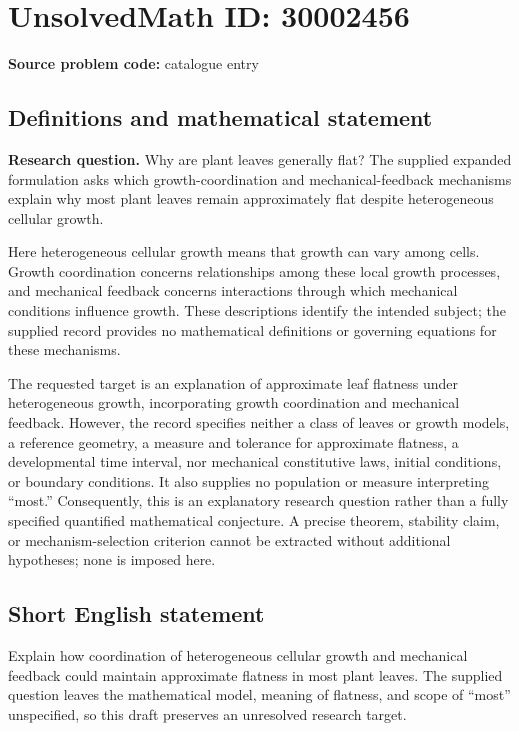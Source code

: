 \documentclass[11pt]{article}
\begin{document}
\section*{UnsolvedMath ID: 30002456}
\textbf{Source problem code:} catalogue entry
\subsection{Definitions and mathematical statement}
\textbf{Research question.} Why are plant leaves generally flat? The supplied expanded formulation asks which growth-coordination and mechanical-feedback mechanisms explain why most plant leaves remain approximately flat despite heterogeneous cellular growth.

Here heterogeneous cellular growth means that growth can vary among cells. Growth coordination concerns relationships among these local growth processes, and mechanical feedback concerns interactions through which mechanical conditions influence growth. These descriptions identify the intended subject; the supplied record provides no mathematical definitions or governing equations for these mechanisms.

The requested target is an explanation of approximate leaf flatness under heterogeneous growth, incorporating growth coordination and mechanical feedback. However, the record specifies neither a class of leaves or growth models, a reference geometry, a measure and tolerance for approximate flatness, a developmental time interval, nor mechanical constitutive laws, initial conditions, or boundary conditions. It also supplies no population or measure interpreting ``most.'' Consequently, this is an explanatory research question rather than a fully specified quantified mathematical conjecture. A precise theorem, stability claim, or mechanism-selection criterion cannot be extracted without additional hypotheses; none is imposed here.
\subsection{Short English statement}
Explain how coordination of heterogeneous cellular growth and mechanical feedback could maintain approximate flatness in most plant leaves. The supplied question leaves the mathematical model, meaning of flatness, and scope of ``most'' unspecified, so this draft preserves an unresolved research target.
\end{document}
